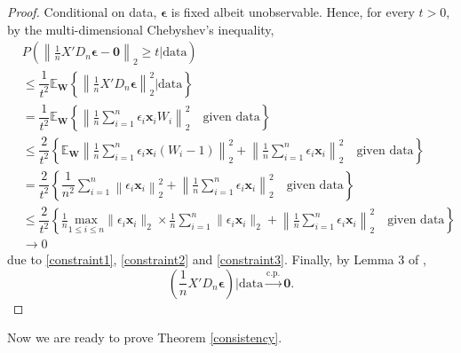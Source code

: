 \documentclass[12pt]{article}
\newcommand{\EX}{\mathbb{E}} %
\newcommand{\ep}{\bm{\epsilon}} %
\newcommand{\sumin}{\sum_{i=1}^n} %
\newcommand{\dn}{\frac{1}{n}} %
\newcommand{\CONV}[1]{\stackrel{\text{#1}}{\longrightarrow}} %
\newcommand{\x}{\bm{x}_i} %
\begin{document}
\begin{proof}
	Conditional on data, $\ep$ is fixed albeit unobservable. Hence, for every $t > 0$, by the multi-dimensional Chebyshev's inequality, 
	\begin{align*}
	&P \left( 
			\left\|  
					\dn X' D_n \ep - \bm{0} 
			\right\|_2  
			\geq t \bigg| \text{data}  
	  \right) \\
	&\leq \dfrac{1}{t^2}
		 \EX_{\bm{W}} \left\{ 
		 			  	 \left\| 
		 			  		\dn X' D_n \ep 
		 			  	 \right\|_2^2 \bigg| \text{data}
		 			  \right\} \\
	&= \dfrac{1}{t^2}
			\EX_{\bm{W}} 
			\left\{ 
				\left\| 
					\dn \sumin \epsilon_i \x W_i 
				\right\|_2^2 
				\quad \text{given data}
			\right\} \\
	&\leq \dfrac{2}{t^2}
			\left\{
				\EX_{\bm{W}} 
				\left\| 
						\dn \sumin \epsilon_i \x (W_i - 1)
				\right\|_2^2
				+
				\left\|
						\dn \sumin \epsilon_i \x 
				\right\|_2^2 
				\quad \text{given data}
			\right\} \\
	&= \dfrac{2}{t^2}
			\left\{
					\dfrac{1}{n^2} \sumin
					\left\| 
						\epsilon_i \x 
					\right\|_2^2
					+
					\left\|
						\dn \sumin \epsilon_i \x 
					\right\|_2^2 
					\quad \text{given data}
			\right\} \\
	&\leq \dfrac{2}{t^2}
			\left\{
				\dn \underset{1 \leq i \leq n}{\text{max}} 
				\| \epsilon_i \x \|_2 
				\times
				\dn \sumin \| \epsilon_i \x \|_2 
				+ 
				\left\|
					\dn \sumin \epsilon_i \x 
				\right\|_2^2   
			\quad \text{given data}
			\right\} \\
	&\to 0
	\end{align*}
	due to \eqref{constraint1}, \eqref{constraint2} and \eqref{constraint3}. Finally, by Lemma 3 of \citet{newton1991},
	$$
	\left( \dn X'D_n \ep \right) \bigg| \text{data} \CONV{c.p.} \bm{0}.
	$$ 
\end{proof}

Now we are ready to prove Theorem \ref{consistency}. 
\end{document}
